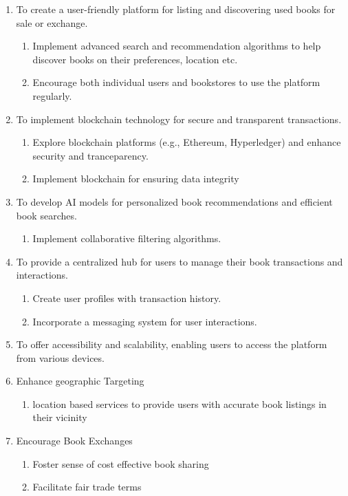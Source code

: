 
\begin{enumerate}
    \item To create a user-friendly platform for listing and discovering used books for sale or exchange.
      \begin{enumerate}
          \item Implement advanced search and recommendation algorithms to help discover books on their preferences, location etc.
          \item Encourage both individual users and bookstores to use the platform regularly.
      \end{enumerate}
    \item To implement blockchain technology for secure and transparent transactions.
      \begin{enumerate}
          \item Explore blockchain platforms (e.g., Ethereum, Hyperledger) and enhance security and tranceparency.
          \item Implement blockchain for ensuring data integrity
      \end{enumerate}
    \item To develop AI models for personalized book recommendations and efficient book searches.
      \begin{enumerate}
          \item Implement collaborative filtering algorithms.
      \end{enumerate}
    \item To provide a centralized hub for users to manage their book transactions and interactions.
      \begin{enumerate}
          \item Create user profiles with transaction history.
          \item Incorporate a messaging system for user interactions.
      \end{enumerate}
    \item To offer accessibility and scalability, enabling users to access the platform from various devices.
    \item Enhance geographic Targeting
      \begin{enumerate}
       \item location based services to provide users with accurate book listings in their vicinity
      \end{enumerate}
       \item Encourage Book Exchanges
      \begin{enumerate}
          \item Foster sense of cost effective book sharing
         \item Facilitate fair trade terms
      \end{enumerate}
  \end{enumerate}
